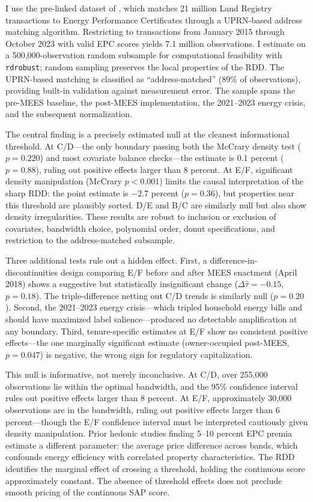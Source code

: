 \documentclass[12pt]{article}
\begin{document}
I use the pre-linked dataset of \citet{chi2023linked}, which matches 21 million Land Registry transactions to Energy Performance Certificates through a UPRN-based address matching algorithm. Restricting to transactions from January 2015 through October 2023 with valid EPC scores yields 7.1 million observations. I estimate on a 500,000-observation random subsample for computational feasibility with \texttt{rdrobust}; random sampling preserves the local properties of the RDD. The UPRN-based matching is classified as ``address-matched'' (89\% of observations), providing built-in validation against measurement error. The sample spans the pre-MEES baseline, the post-MEES implementation, the 2021--2023 energy crisis, and the subsequent normalization.

The central finding is a precisely estimated null at the cleanest informational threshold. At C/D---the only boundary passing both the McCrary density test ($p = 0.220$) and most covariate balance checks---the estimate is 0.1 percent ($p = 0.88$), ruling out positive effects larger than 8 percent. At E/F, significant density manipulation (McCrary $p < 0.001$) limits the causal interpretation of the sharp RDD: the point estimate is $-2.7$ percent ($p = 0.36$), but properties near this threshold are plausibly sorted. D/E and B/C are similarly null but also show density irregularities. These results are robust to inclusion or exclusion of covariates, bandwidth choice, polynomial order, donut specifications, and restriction to the address-matched subsample.

Three additional tests rule out a hidden effect. First, a difference-in-discontinuities design comparing E/F before and after MEES enactment (April 2018) shows a suggestive but statistically insignificant change ($\Delta\hat{\tau} = -0.15$, $p = 0.18$). The triple-difference netting out C/D trends is similarly null ($p = 0.20$). Second, the 2021--2023 energy crisis---which tripled household energy bills and should have maximized label salience---produced no detectable amplification at any boundary. Third, tenure-specific estimates at E/F show no consistent positive effects---the one marginally significant estimate (owner-occupied post-MEES, $p = 0.047$) is negative, the wrong sign for regulatory capitalization.

This null is informative, not merely inconclusive. At C/D, over 255,000 observations lie within the optimal bandwidth, and the 95\% confidence interval rules out positive effects larger than 8 percent. At E/F, approximately 30,000 observations are in the bandwidth, ruling out positive effects larger than 6 percent---though the E/F confidence interval must be interpreted cautiously given density manipulation. Prior hedonic studies finding 5--10 percent EPC premia \citep{fuerst2015does, aydin2020capitalization} estimate a different parameter: the average price difference across bands, which confounds energy efficiency with correlated property characteristics. The RDD identifies the marginal effect of crossing a threshold, holding the continuous score approximately constant. The absence of threshold effects does not preclude smooth pricing of the continuous SAP score.
\end{document}
